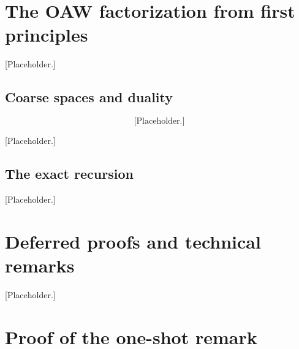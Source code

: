 \appendix

\section{The OAW factorization from first principles}
\label{app:oaw}
[Placeholder.]

\subsection{Coarse spaces and duality}
\begin{equation}\label{eq:dual_basis}
  \text{[Placeholder.]}
\end{equation}

\begin{theorem}\label{thm:energy_decay}
[Placeholder.]
\end{theorem}

\subsection{The exact recursion}
\label{sec:background:oaw}
[Placeholder.]

\section{Deferred proofs and technical remarks}
\begin{lemma}\label{lem:cdagger_independence}
[Placeholder.]
\end{lemma}

\section{Proof of the one-shot remark}
\label{app:oneshot}

